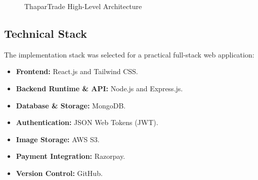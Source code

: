 \documentclass[12pt,a4paper,oneside]{report}
\begin{document}
\begin{figure}[H]

\caption{ThaparTrade High-Level Architecture}

\label{fig:architecture}

\end{figure}


\subsection{Technical Stack}

The implementation stack was selected for a practical full-stack web
application:

\begin{itemize}

\item \textbf{Frontend:} React.js and Tailwind CSS.

\item \textbf{Backend Runtime \& API:} Node.js and Express.js.

\item \textbf{Database \& Storage:} MongoDB.

\item \textbf{Authentication:} JSON Web Tokens (JWT).

\item \textbf{Image Storage:} AWS S3.

\item \textbf{Payment Integration:} Razorpay.

\item \textbf{Version Control:} GitHub.

\end{itemize}
\end{document}
